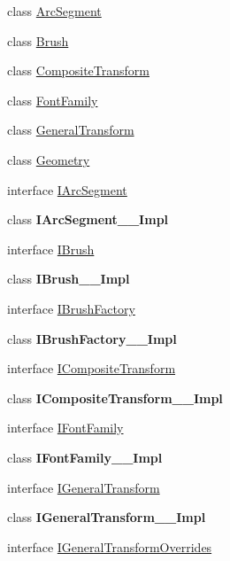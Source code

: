 \begin{DoxyCompactItemize}
\item 
class \hyperlink{class_windows_1_1_u_i_1_1_xaml_1_1_media_1_1_arc_segment}{Arc\+Segment}
\item 
class \hyperlink{class_windows_1_1_u_i_1_1_xaml_1_1_media_1_1_brush}{Brush}
\item 
class \hyperlink{class_windows_1_1_u_i_1_1_xaml_1_1_media_1_1_composite_transform}{Composite\+Transform}
\item 
class \hyperlink{class_windows_1_1_u_i_1_1_xaml_1_1_media_1_1_font_family}{Font\+Family}
\item 
class \hyperlink{class_windows_1_1_u_i_1_1_xaml_1_1_media_1_1_general_transform}{General\+Transform}
\item 
class \hyperlink{class_windows_1_1_u_i_1_1_xaml_1_1_media_1_1_geometry}{Geometry}
\item 
interface \hyperlink{interface_windows_1_1_u_i_1_1_xaml_1_1_media_1_1_i_arc_segment}{I\+Arc\+Segment}
\item 
class {\bfseries I\+Arc\+Segment\+\_\+\+\_\+\+Impl}
\item 
interface \hyperlink{interface_windows_1_1_u_i_1_1_xaml_1_1_media_1_1_i_brush}{I\+Brush}
\item 
class {\bfseries I\+Brush\+\_\+\+\_\+\+Impl}
\item 
interface \hyperlink{interface_windows_1_1_u_i_1_1_xaml_1_1_media_1_1_i_brush_factory}{I\+Brush\+Factory}
\item 
class {\bfseries I\+Brush\+Factory\+\_\+\+\_\+\+Impl}
\item 
interface \hyperlink{interface_windows_1_1_u_i_1_1_xaml_1_1_media_1_1_i_composite_transform}{I\+Composite\+Transform}
\item 
class {\bfseries I\+Composite\+Transform\+\_\+\+\_\+\+Impl}
\item 
interface \hyperlink{interface_windows_1_1_u_i_1_1_xaml_1_1_media_1_1_i_font_family}{I\+Font\+Family}
\item 
class {\bfseries I\+Font\+Family\+\_\+\+\_\+\+Impl}
\item 
interface \hyperlink{interface_windows_1_1_u_i_1_1_xaml_1_1_media_1_1_i_general_transform}{I\+General\+Transform}
\item 
class {\bfseries I\+General\+Transform\+\_\+\+\_\+\+Impl}
\item 
interface \hyperlink{interface_windows_1_1_u_i_1_1_xaml_1_1_media_1_1_i_general_transform_overrides}{I\+General\+Transform\+Overrides}
\item 

\end{DoxyCompactItemize}
